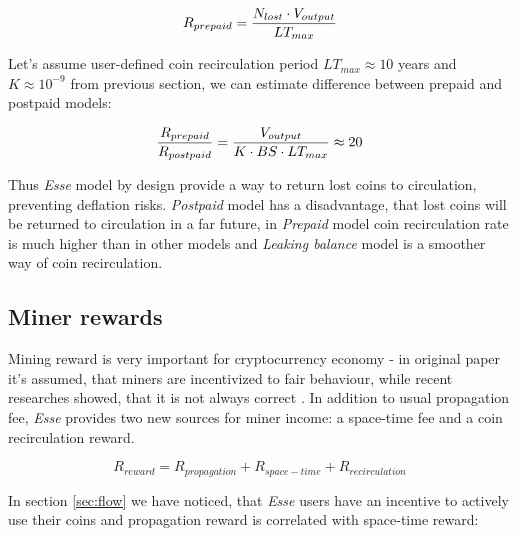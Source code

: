 \documentclass[]{article}   %
\newcommand{\authnote}[2]{\marginpar{\parbox{\marginparwidth}{\tiny %
  \textsf{#1 {\textcolor{blue}{notes: #2}}}}}%
  \textcolor{blue}{\textbf{\dag}}}
\newcommand{\authnote}[2]{
  \textsf{#1 \textcolor{blue}{: #2}}}
\newcommand{\authnote}[2]{}
\newcommand{\dnote}[1]{{\authnote{\textcolor{blue}{Dima notes}}{#1}}}
\newcommand{\esse}{\textit{Esse}}
\begin{document}
\begin{equation}
R_{prepaid} = {N_{lost} \cdot V_{output} \over LT_{max}}
\end{equation}

Let's assume user-defined coin recirculation period $LT_{max}\approx10$ years and $K\approx10^{-9}$ from previous section, we can estimate difference between prepaid and postpaid models:

\begin{equation}
{R_{prepaid} \over R_{postpaid}} = { V_{output}  \over  K \cdot BS \cdot LT_{max}} \approx 20
\end{equation}


 \dnote{Check, should be something like 1000}

Thus \esse{} model by design provide a way to return lost coins to circulation, preventing deflation risks. \textit{Postpaid} model has a disadvantage, that lost coins will be returned to circulation in a far future, in \textit{Prepaid} model coin recirculation rate is much higher than in other models and \textit{Leaking balance} model is a smoother way of coin recirculation.

\subsection{Miner rewards}
\label{minerrew}
Mining reward is very important for cryptocurrency economy - in original paper \cite{Nakamoto2008} it's assumed, that miners are incentivized to fair behaviour, while recent researches showed, that it is not always correct \cite{carlsten2016instability, eyal2014}. In addition to usual propagation fee, \esse{} provides two new sources for miner income: a space-time fee and a coin recirculation reward.

\begin{equation}
R_{reward} = R_{propagation} + R_{space-time} + R_{recirculation}
\end{equation}

In section \ref{sec:flow} we have noticed, that \esse{} users have an incentive to actively use their coins and propagation reward is correlated with space-time reward:
\end{document}
